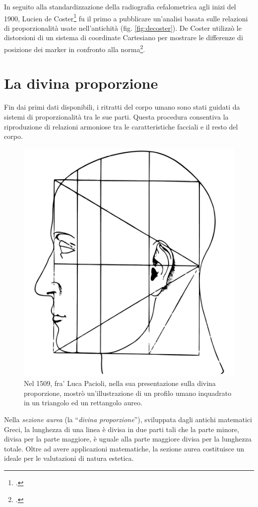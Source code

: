 In seguito alla standardizzazione della radiografia cefalometrica agli inizi del 1900, Lucien de Coster\footcite{Coster1939} fu il primo a pubblicare un'analisi basata sulle relazioni di proporzionalità usate nell'antichità (fig. \vref{fig:decoster}). De Coster utilizzò le distorsioni di un sistema di coordinate Cartesiano per mostrare le differenze di posizione dei marker in confronto alla norma\footcite{Izard1943}.

\section{La divina proporzione}

Fin dai primi dati disponibili, i ritratti del corpo umano sono stati guidati da sistemi di proporzionalità tra le sue parti. Questa procedura consentiva la riproduzione di relazioni armoniose tra le caratteristiche facciali e il resto del corpo.

\begin{figure}
\centering
\includegraphics[width=.5\textwidth]{./images/pacioli.pdf}
\caption{Nel 1509, fra' Luca Pacioli, nella sua presentazione sulla divina proporzione, mostrò un'illustrazione di un profilo umano inquadrato in un triangolo ed un rettangolo aureo.}
\label{fig:pacioli}
\end{figure}

Nella \textit{sezione aurea} (la ``\textit{divina proporzione}''), sviluppata dagli antichi matematici Greci, la lunghezza di una linea è divisa in due parti tali che la parte minore, divisa per la parte maggiore, è uguale alla parte maggiore divisa per la lunghezza totale. Oltre ad avere applicazioni matematiche, la sezione aurea costituisce un ideale per le valutazioni di natura estetica.

